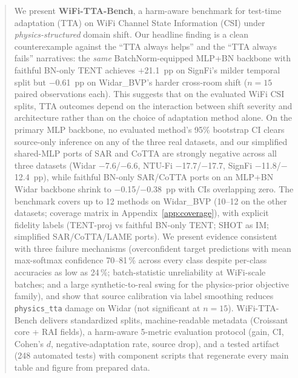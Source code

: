 \begin{abstract}
We present \textbf{WiFi-TTA-Bench}, a harm-aware benchmark for test-time adaptation (TTA) on WiFi Channel State Information (CSI) under \emph{physics-structured} domain shift. Our headline finding is a clean counterexample against the ``TTA always helps'' and the ``TTA always fails'' narratives: the \emph{same} BatchNorm-equipped MLP+BN backbone with faithful BN-only TENT achieves $+$21.1~pp on SignFi's milder temporal split but $-$0.61~pp on Widar\_BVP's harder cross-room shift ($n{=}15$ paired observations each). This suggests that on the evaluated WiFi CSI splits, TTA outcomes depend on the interaction between shift severity and architecture rather than on the choice of adaptation method alone. On the primary MLP backbone, no evaluated method's 95\% bootstrap CI clears source-only inference on any of the three real datasets, and our simplified shared-MLP ports of SAR and CoTTA are strongly negative across all three datasets (Widar $-$7.6/$-$6.6, NTU-Fi $-$17.7/$-$17.7, SignFi $-$11.8/$-$12.4~pp), while faithful BN-only SAR/CoTTA ports on an MLP+BN Widar backbone shrink to $-$0.15/$-$0.38~pp with CIs overlapping zero. The benchmark covers up to 12 methods on Widar\_BVP (10--12 on the other datasets; coverage matrix in Appendix~\ref{app:coverage}), with explicit fidelity labels (TENT-proj vs faithful BN-only TENT; SHOT as IM; simplified SAR/CoTTA/LAME ports). We present evidence consistent with three failure mechanisms (overconfident target predictions with mean max-softmax confidence 70--81\,\% across every class despite per-class accuracies as low as 24\,\%; batch-statistic unreliability at WiFi-scale batches; and a large synthetic-to-real swing for the physics-prior objective family), and show that source calibration via label smoothing reduces \texttt{physics\_tta} damage on Widar (not significant at $n{=}15$). WiFi-TTA-Bench delivers standardized splits, machine-readable metadata (Croissant core + RAI fields), a harm-aware 5-metric evaluation protocol (gain, CI, Cohen's $d$, negative-adaptation rate, source drop), and a tested artifact (248 automated tests) with component scripts that regenerate every main table and figure from prepared data.
\end{abstract}
